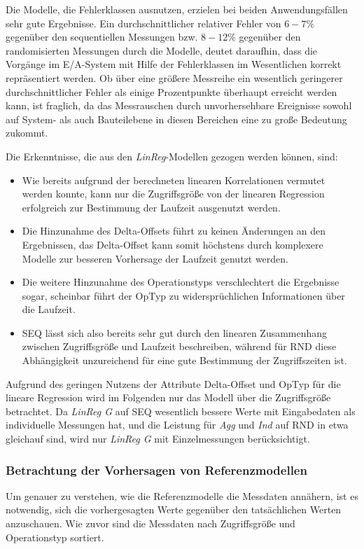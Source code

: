 \documentclass[
	12pt,
	a4paper,
	BCOR10mm,
	DIV14,
	listof=totoc,
	bibliography=totoc,
	headsepline
]{scrreprt}
\begin{document}
Die Modelle, die Fehlerklassen ausnutzen, erzielen bei beiden Anwendungsfällen sehr gute Ergebnisse.
Ein durchschnittlicher relativer Fehler von $6-7\%$ gegenüber den sequentiellen Messungen bzw. $8-12\%$ gegenüber den randomisierten Messungen durch die Modelle, deutet daraufhin, dass die Vorgänge im E/A-System mit Hilfe der Fehlerklassen im Wesentlichen korrekt repräsentiert werden.
Ob über eine größere Messreihe ein wesentlich geringerer durchschnittlicher Fehler als einige Prozentpunkte überhaupt erreicht werden kann, ist fraglich, da das Messrauschen durch unvorhersehbare Ereignisse sowohl auf System- als auch Bauteilebene in diesen Bereichen eine zu große Bedeutung zukommt. \medskip
 
Die Erkenntnisse, die aus den \textit{LinReg}-Modellen gezogen werden können, sind:
\begin{itemize}
	\item Wie bereits aufgrund der berechneten linearen Korrelationen vermutet werden konnte, kann nur die Zugriffsgröße von der linearen Regression erfolgreich zur Bestimmung der Laufzeit ausgenutzt werden.
	\item Die Hinzunahme des Delta-Offsets führt zu keinen Änderungen an den Ergebnissen, das Delta-Offset kann somit höchstens durch komplexere Modelle zur besseren Vorhersage der Laufzeit genutzt werden.
	\item Die weitere Hinzunahme des Operationstyps verschlechtert die Ergebnisse sogar, scheinbar führt der OpTyp zu widersprüchlichen Informationen über die Laufzeit.	
	\item SEQ lässt sich also bereits sehr gut durch den linearen Zusammenhang zwischen Zugriffsgröße und Laufzeit beschreiben, während für RND diese Abhängigkeit unzureichend für eine gute Bestimmung der Zugriffszeiten ist.
\end{itemize}
 
Aufgrund des geringen Nutzens der Attribute Delta-Offset und OpTyp für die lineare Regression wird im Folgenden nur das Modell über die Zugriffsgröße betrachtet.
Da \textit{LinReg G} auf SEQ wesentlich bessere Werte mit Eingabedaten als individuelle Messungen hat, und die Leistung für \textit{Agg} und \textit{Ind} auf RND in etwa gleichauf sind, wird nur \textit{LinReg G} mit Einzelmessungen berücksichtigt.\\

\subsubsection{Betrachtung der Vorhersagen von Referenzmodellen}
Um genauer zu verstehen, wie die Referenzmodelle die Messdaten annähern, ist es notwendig, sich die vorhergesagten Werte gegenüber den tatsächlichen Werten anzuschauen.
Wie zuvor sind die Messdaten nach Zugriffsgröße und Operationstyp sortiert.\medskip
\end{document}
